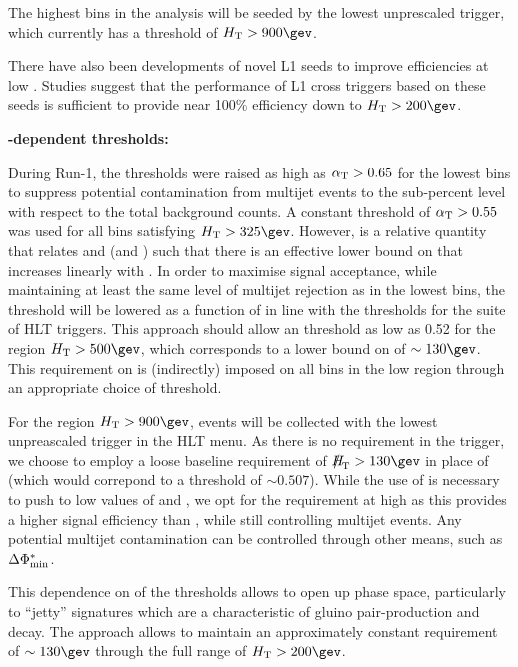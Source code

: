 The highest \scalht bins in the analysis will be seeded by the lowest
unprescaled \scalht trigger, which currently has a threshold of
$\scalht > 900\gev$.

There have also been developments of novel L1 seeds to improve
efficiencies at low \scalht. Studies suggest that the performance of
L1 cross triggers based on these seeds is sufficient to provide near
100\% efficiency down to $\scalht > 200\gev$.

{\bf \scalht-dependent \alphat thresholds:}

During Run-1, the \alphat thresholds were raised as high as $\alpha_{\text{T}} >
0.65$ for the lowest \scalht bins to suppress potential contamination
from multijet events to the sub-percent level with respect to the
total background counts. A constant threshold of $\alpha_{\text{T}} > 0.55$ was
used for all bins satisfying $\scalht > 325\gev$. However, \alphat is
a relative quantity that relates \scalht and \mht (and \dht) such that
there is an effective lower bound on \mht that increases linearly with
\scalht. In order to maximise signal acceptance, while maintaining at
least the same level of multijet rejection as in the lowest \scalht
bins, the \alphat threshold will be lowered as a function of \scalht
in line with the thresholds for the suite of HLT triggers. This
approach should allow an \alphat threshold as low as 0.52 for the
region $\scalht > 500\gev$, which corresponds to a lower bound on \mht
of $\sim130\gev$. This requirement on \mht is (indirectly) imposed on
all bins in the low \scalht region through an appropriate choice of
\alphat threshold.

For the region $\scalht > 900\gev$, events will be collected with the
lowest unpreascaled \scalht trigger in the HLT menu. As there is no
\alphat requirement in the trigger, we choose to employ a loose
baseline requirement of $\mht > 130\gev$ in place of \alphat (which
would correpond to a threshold of $\sim0.507$). While the use of
\alphat is necessary to push to low values of \scalht and \mht, we opt
for the \mht requirement at high \scalht as this provides a higher
signal efficiency than \alphat, while still controlling multijet
events. Any potential multijet contamination can be controlled through
other means, such as $\Delta\Phi^{*}_{\rm min}$.

This dependence on \scalht of the \alphat thresholds allows to open up
phase space, particularly to ``jetty'' signatures which are a
characteristic of gluino pair-production and decay. The approach
allows to maintain an approximately constant \mht requirement of
$\sim130\gev$ through the full range of $\scalht > 200\gev$.

